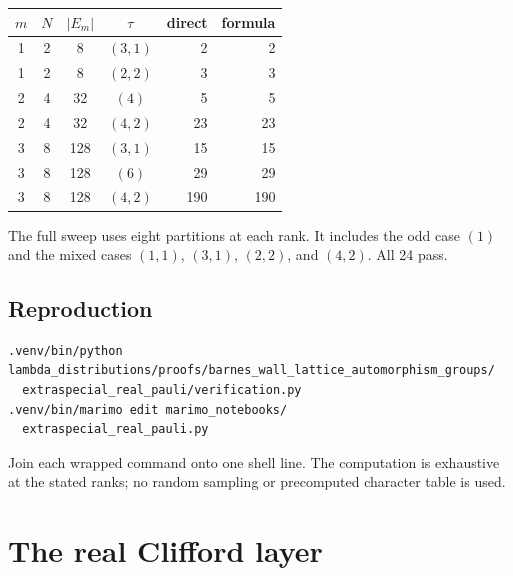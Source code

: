\documentclass[10pt]{article}
\newcommand{\SMG}{\operatorname{SMG}}
\newcommand{\MGF}{\SMG}
\begin{document}
\begin{center}
\begin{tabular}{@{}c@{\quad}c@{\quad}c@{\quad}c@{\qquad}r@{\qquad}r@{}}\toprule
$m$&$N$&$|E_m|$&$\tau$&direct&formula\\\midrule
1&2&8&$(3,1)$&2&2\\
1&2&8&$(2,2)$&3&3\\
2&4&32&$(4)$&5&5\\
2&4&32&$(4,2)$&23&23\\
3&8&128&$(3,1)$&15&15\\
3&8&128&$(6)$&29&29\\
3&8&128&$(4,2)$&190&190\\\bottomrule
\end{tabular}
\end{center}
The full sweep uses eight partitions at each rank.  It includes the odd
case $(1)$ and the mixed cases $(1,1)$, $(3,1)$, $(2,2)$, and $(4,2)$.
All 24 pass.

\subsection{Reproduction}
\begin{verbatim}
.venv/bin/python lambda_distributions/proofs/barnes_wall_lattice_automorphism_groups/
  extraspecial_real_pauli/verification.py
.venv/bin/marimo edit marimo_notebooks/
  extraspecial_real_pauli.py
\end{verbatim}
Join each wrapped command onto one shell line.  The computation is exhaustive
at the stated ranks; no random sampling or precomputed character table is
used.
\endgroup


\clearpage
\section{The real Clifford layer}\label{proof:real-clifford}
\begingroup
{}
\providecommand{\MGF}{\SMG}
\renewcommand{\MGF}{\SMG}
\setcounter{theorem}{0}
\setcounter{proposition}{0}
\setcounter{lemma}{0}
\setcounter{corollary}{0}
\setcounter{remark}{0}
\begin{abstract}
We prove the exact reduction of the real Clifford sigma--MGF to coset
averages over $O^+(2m,2)$ and state precisely what the self-dual-code theorem
does and does not imply for mixed coefficients.  Exhaustive matrix closures
in dimensions $2$ and $4$ recover group orders $16$ and $2304$, quotient
orders $2$ and $72$, lift independence, and 16 direct coefficient matches.
\end{abstract}
\end{document}
